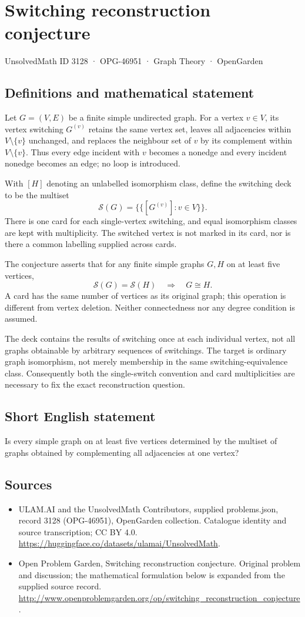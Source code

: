 \documentclass[11pt,a4paper]{article}
\begin{document}
\section*{Switching reconstruction conjecture}\label{3128}
{\small UnsolvedMath ID 3128 · OPG-46951 · Graph Theory · OpenGarden}
\subsection{Definitions and mathematical statement}
Let $G=(V,E)$ be a finite simple undirected graph. For a vertex $v\in V$,
its vertex switching $G^{(v)}$ retains the same vertex set, leaves all
adjacencies within $V\setminus\{v\}$ unchanged, and replaces the neighbour
set of $v$ by its complement within $V\setminus\{v\}$. Thus every edge
incident with $v$ becomes a nonedge and every incident nonedge becomes
an edge; no loop is introduced.

With $[H]$ denoting an unlabelled isomorphism class, define the switching
deck to be the multiset
\[
 \mathcal S(G)=\{\!\{[G^{(v)}]:v\in V\}\!\}.
\]
There is one card for each single-vertex switching, and equal isomorphism
classes are kept with multiplicity. The switched vertex is not marked
in its card, nor is there a common labelling supplied across cards.

The conjecture asserts that for any finite simple graphs $G,H$ on
at least five vertices,
\[
 \mathcal S(G)=\mathcal S(H)\quad\Longrightarrow\quad G\cong H.
\]
A card has the same number of vertices as its original graph; this
operation is different from vertex deletion. Neither connectedness nor
any degree condition is assumed.

The deck contains the results of switching once at each individual
vertex, not all graphs obtainable by arbitrary sequences of switchings.
The target is ordinary graph isomorphism, not merely membership in the
same switching-equivalence class. Consequently both the single-switch
convention and card multiplicities are necessary to fix the exact
reconstruction question.
\subsection{Short English statement}
Is every simple graph on at least five vertices determined by the multiset of graphs obtained by complementing all adjacencies at one vertex?
\subsection{Sources}
\begin{itemize}
\item[S1] ULAM.AI and the UnsolvedMath Contributors, supplied problems.json, record 3128 (OPG-46951), OpenGarden collection. Catalogue identity and source transcription; CC BY 4.0.
\url{https://huggingface.co/datasets/ulamai/UnsolvedMath}.
\item[S2] Open Problem Garden, Switching reconstruction conjecture. Original problem and discussion; the mathematical formulation below is expanded from the supplied source record.
\url{http://www.openproblemgarden.org/op/switching_reconstruction_conjecture}.
\end{itemize}
\end{document}
